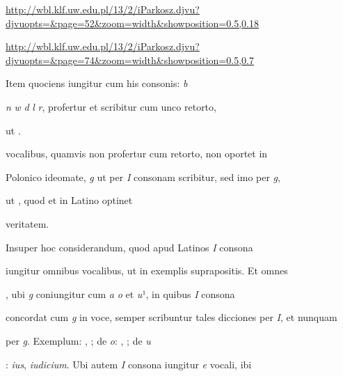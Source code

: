 
\newParkoszpage

{
\url{http://wbl.klf.uw.edu.pl/13/2/iParkosz.djvu?djvuopts=&page=52&zoom=width&showposition=0.5,0.18}

\url{http://wbl.klf.uw.edu.pl/13/2/iParkosz.djvu?djvuopts=&page=74&zoom=width&showposition=0.5,0.7}
}

\bigskip

\obeylines
\mono



\fullpreviouslines


{
\color{blue}

\indentK Item quociens iungitur cum his consonis: \textit{b}

\textit{n} \textit{w} \textit{d} \textit{l} \textit{r}, profertur et scribitur cum unco retorto,

}


\fulllines

ut    .

vocalibus, quamvis non profertur cum  retorto, non oportet in

Polonico ideomate, \textit{g} ut per \textit{I} consonam scribitur, sed imo per \textit{g},

ut    , quod et in Latino optinet

\splitlines

veritatem.

\indentK Insuper hoc considerandum, quod apud Latinos \textit{I} consona

\fulllines

iungitur omnibus vocalibus, ut in exemplis suprapositis. Et omnes 

, ubi \textit{g} coniungitur cum \textit{a} \textit{o} et \textit{u}¹, in quibus \textit{I} consona

concordat cum \textit{g} in voce, semper scribuntur tales dicciones per \textit{I}, et nunquam

per \textit{g}. Exemplum: , ; de \textit{o}: , ; de \textit{u}

: \textit{ius}, \textit{iudicium}. Ubi autem \textit{I} consona iungitur \textit{e} vocali, ibi

